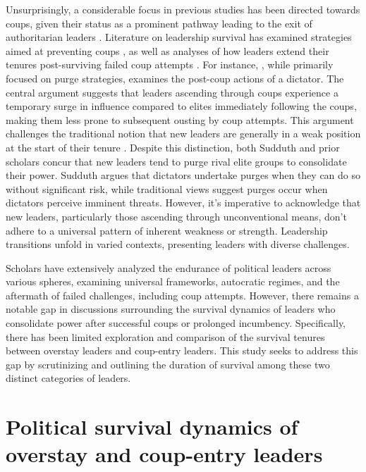 \documentclass[
  12pt,
  a4paper,
  12pt]{article}
\begin{document}
Unsurprisingly, a considerable focus in previous studies has been
directed towards coups, given their status as a prominent pathway
leading to the exit of authoritarian leaders
\citep{svolik2008, frantz2016}. Literature on leadership survival has
examined strategies aimed at preventing coups
\citep{powell2017, sudduth2017, debruin2020}, as well as analyses of how
leaders extend their tenures post-surviving failed coup attempts
\citep{easton2018}. For instance, \citet{sudduth2017a}, while primarily
focused on purge strategies, examines the post-coup actions of a
dictator. The central argument suggests that leaders ascending through
coups experience a temporary surge in influence compared to elites
immediately following the coups, making them less prone to subsequent
ousting by coup attempts. This argument challenges the traditional
notion that new leaders are generally in a weak position at the start of
their tenure \citep{roessler2011}. Despite this distinction, both
Sudduth and prior scholars concur that new leaders tend to purge rival
elite groups to consolidate their power. Sudduth argues that dictators
undertake purges when they can do so without significant risk, while
traditional views suggest purges occur when dictators perceive imminent
threats. However, it's imperative to acknowledge that new leaders,
particularly those ascending through unconventional means, don't adhere
to a universal pattern of inherent weakness or strength. Leadership
transitions unfold in varied contexts, presenting leaders with diverse
challenges.

Scholars have extensively analyzed the endurance of political leaders
across various spheres, examining universal frameworks, autocratic
regimes, and the aftermath of failed challenges, including coup
attempts. However, there remains a notable gap in discussions
surrounding the survival dynamics of leaders who consolidate power after
successful coups or prolonged incumbency. Specifically, there has been
limited exploration and comparison of the survival tenures between
overstay leaders and coup-entry leaders. This study seeks to address
this gap by scrutinizing and outlining the duration of survival among
these two distinct categories of leaders.

\hypertarget{political-survival-dynamics-of-overstay-and-coup-entry-leaders}{%
\section{Political survival dynamics of overstay and coup-entry
leaders}\label{political-survival-dynamics-of-overstay-and-coup-entry-leaders}}
\end{document}
